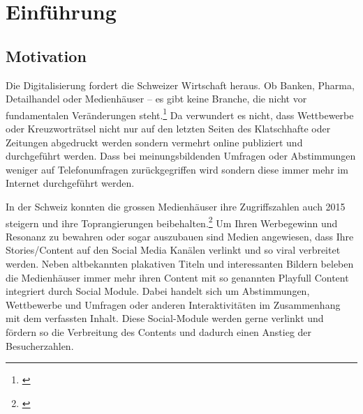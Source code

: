 




\makeatletter
\def\maxwidth{\ifdim\Gin@nat@width>\linewidth\linewidth
\else\Gin@nat@width\fi}
\makeatother
\let\Oldincludegraphics\includegraphics
\renewcommand{\includegraphics}[1]{\Oldincludegraphics[width=\maxwidth]{#1}}

\VerbatimFootnotes

\setlength{\parindent}{0pt}
\setlength{\parskip}{6pt plus 2pt minus 1pt}
\setlength{\emergencystretch}{3em}  %
\providecommand{\tightlist}{%
  \setlength{\itemsep}{0pt}\setlength{\parskip}{0pt}}
\VerbatimFootnotes %




\setcounter{page}{1}


\tableofcontents
\newpage

\chapter{Einführung}\label{einfuxfchrung}

\section{Motivation}\label{motivation}

Die Digitalisierung fordert die Schweizer Wirtschaft heraus. Ob Banken,
Pharma, Detailhandel oder Medienhäuser -- es gibt keine Branche, die
nicht vor fundamentalen Veränderungen steht.\footnote{\autocite{digitalerevolutionhz}}
Da verwundert es nicht, dass Wettbewerbe oder Kreuzworträtsel nicht nur
auf den letzten Seiten des Klatschhafte oder Zeitungen abgedruckt werden
sondern vermehrt online publiziert und durchgeführt werden. Dass bei
meinungsbildenden Umfragen oder Abstimmungen weniger auf Telefonumfragen
zurückgegriffen wird sondern diese immer mehr im Internet durchgeführt
werden.

In der Schweiz konnten die grossen Medienhäuser ihre Zugriffszahlen auch
2015 steigern und ihre Toprangierungen beibehalten.\footnote{\autocite{netmatrixaudit}}
Um Ihren Werbegewinn und Resonanz zu bewahren oder sogar auszubauen sind
Medien angewiesen, dass Ihre Stories/Content auf den Social Media
Kanälen verlinkt und so viral verbreitet werden. Neben altbekannten
plakativen Titeln und interessanten Bildern beleben die Medienhäuser
immer mehr ihren Content mit so genannten Playfull Content integriert
durch Social Module. Dabei handelt sich um Abstimmungen, Wettbewerbe und
Umfragen oder anderen Interaktivitäten im Zusammenhang mit dem
verfassten Inhalt. Diese Social-Module werden gerne verlinkt und fördern
so die Verbreitung des Contents und dadurch einen Anstieg der
Besucherzahlen.

